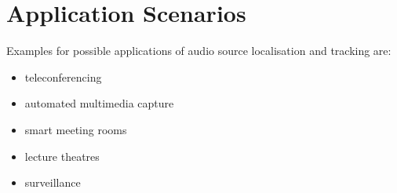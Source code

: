\section{Application Scenarios}
Examples for possible applications of audio source localisation and tracking are:
\begin{itemize}
\setlength\itemsep{0cm}
	\item teleconferencing
	\item automated multimedia capture
	\item smart meeting rooms
	\item lecture theatres \cite{Lehmann2007}
\item surveillance
\end{itemize}